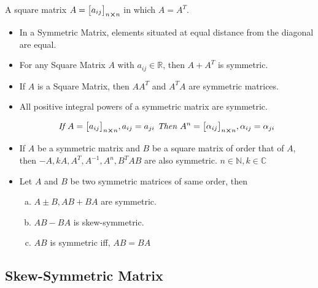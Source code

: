 \documentclass{article}
\begin{document}
A square matrix $A={\begin{bmatrix}
        a_{ij}
    \end{bmatrix}}_{n \cross n} $ in which $A=A^T$.
\begin{itemize}


    \item In a Symmetric Matrix, elements situated at equal distance from the diagonal are equal.
    \item For any Square Matrix $A$ with $a_{ij} \in \mathbb{R}$, then $A+A^T$ is symmetric.
    \item If $A$ is a Square Matrix, then $AA^T$ and $A^TA$ are symmetric matrices.
    \item All positive integral powers of a symmetric matrix are symmetric.

          $$\textit{If } A={\begin{bmatrix}
                  a_{ij}
              \end{bmatrix}}_{n \cross n}, a_{ij}=a_{ji} \textit{ Then } A^n={\begin{bmatrix}
                  \alpha_{ij}
              \end{bmatrix}}_{n \cross n}, \alpha_{ij}=\alpha_{ji} $$
    \item If $A$ be a symmetric matrix and $B$ be a square matrix of order that of $A$, then $-A, kA, A^T, A^{-1},A^n, B^TAB $ are also symmetric. $n \in \mathbb{N}, k \in \mathbb{C} $
    \item Let $A$ and $B$ be two symmetric matrices of same order, then

          \begin{enumerate}[a.]
              \item $A \pm B, AB+BA $ are symmetric.
              \item $AB-BA$ is skew-symmetric.
              \item $AB$ is symmetric iff, $AB=BA$
          \end{enumerate}
\end{itemize}

\subsection{Skew-Symmetric Matrix}
\end{document}
